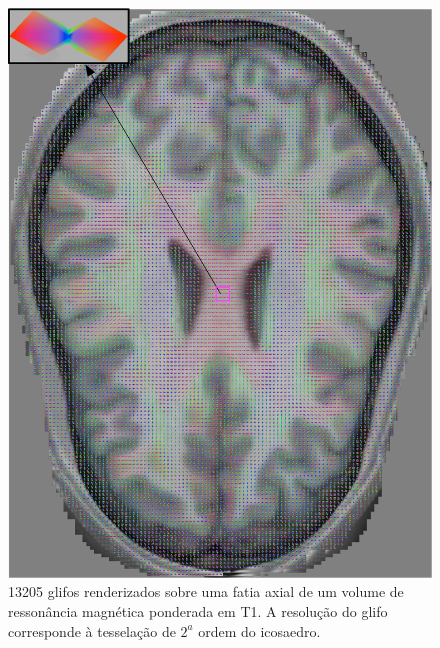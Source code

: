  \begin{figure}[H]
     \centering
     \includegraphics[width=1.0\linewidth, angle=0]{figs/Renderizacao_glifos_evolucao/Adaptividade-multimodal/Fatia_glifo_tf_42_leg.png}
      \caption{13205 glifos renderizados sobre uma fatia axial de um volume de ressonância magnética ponderada em T1. A resolução do glifo corresponde à  tesselação de $2^a$ ordem do icosaedro.}
       \label{fig::qualidade_visual_longe_lowres}
 \end{figure}
 
